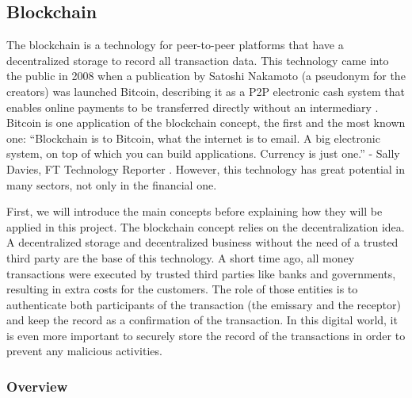 \subsection{Blockchain}

The blockchain is a technology for peer-to-peer platforms that have a decentralized storage to record all transaction data. This technology came into the public in 2008  when a publication by Satoshi Nakamoto (a pseudonym for the creators) was launched Bitcoin, describing it as a \ac{P2P} electronic cash system that enables online payments to be transferred directly without an intermediary \cite{bitcoin}. Bitcoin is one application of the blockchain concept, the first and the most known one:  “Blockchain is to Bitcoin, what the internet is to email. A big electronic system, on top of which you can build applications. Currency is just one.” - Sally Davies, FT Technology Reporter \cite{Howbitcoinanditsblockchainwork}. However, this technology has great potential in many sectors, not only in the financial one.


First, we will introduce the main concepts before explaining how they will be applied in this project. The blockchain concept relies on the decentralization idea. A decentralized storage and decentralized business without the need of a trusted third party are the base of this technology. A short time ago, all money transactions were executed by trusted third parties like banks and governments, resulting in extra costs for the customers. The role of those entities is to authenticate both participants of the transaction (the emissary and the receptor) and keep the record as a confirmation of the transaction. In this digital world, it is even more important to securely store the record of the transactions in order to prevent any malicious activities. 



\subsubsection{Overview}


